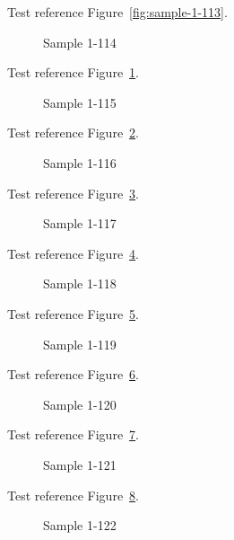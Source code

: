 Test reference Figure~\ref{fig:sample-1-113}.

\begin{figure}[tbhp]
\caption{Sample 1-114}
\label{fig:sample-1-114}
\end{figure}

Test reference Figure~\ref{fig:sample-1-114}.

\begin{figure}[tbhp]
\caption{Sample 1-115}
\label{fig:sample-1-115}
\end{figure}

Test reference Figure~\ref{fig:sample-1-115}.

\begin{figure}[tbhp]
\caption{Sample 1-116}
\label{fig:sample-1-116}
\end{figure}

Test reference Figure~\ref{fig:sample-1-116}.

\begin{figure}[tbhp]
\caption{Sample 1-117}
\label{fig:sample-1-117}
\end{figure}

Test reference Figure~\ref{fig:sample-1-117}.

\begin{figure}[tbhp]
\caption{Sample 1-118}
\label{fig:sample-1-118}
\end{figure}

Test reference Figure~\ref{fig:sample-1-118}.

\begin{figure}[tbhp]
\caption{Sample 1-119}
\label{fig:sample-1-119}
\end{figure}

Test reference Figure~\ref{fig:sample-1-119}.

\begin{figure}[tbhp]
\caption{Sample 1-120}
\label{fig:sample-1-120}
\end{figure}

Test reference Figure~\ref{fig:sample-1-120}.

\begin{figure}[tbhp]
\caption{Sample 1-121}
\label{fig:sample-1-121}
\end{figure}

Test reference Figure~\ref{fig:sample-1-121}.

\begin{figure}[tbhp]
\caption{Sample 1-122}
\label{fig:sample-1-122}
\end{figure}

